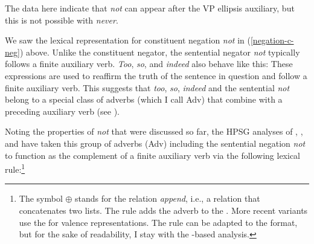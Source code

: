 \documentclass[output=paper
 	        ,biblatex
                ,babelshorthands
                ,newtxmath
                ,draftmode
                ,colorlinks, citecolor=brown
]{langscibook}
\begin{document}
\begin{exe}
\begin{xlist}
\begin{exe}
\begin{xlist}
\eal
\label{negation-vpe-not-ex}
\zl
%
\noindent The data here indicate that \textit{not} can appear
after the VP ellipsis auxiliary, but this is not possible with
\emph{never}.

We saw the lexical representation for constituent negation \textit{not} in (\ref{negation-c-neg})
above. Unlike the constituent negator, the sentential negator \textit{not} typically follows a
finite auxiliary verb. \textit{Too}, \textit{so}, and \textit{indeed} also behave like this: \eal
{}  \zl
%
These expressions are used to
reaffirm the truth of the sentence in question and
follow a finite auxiliary verb. This suggests that \emph{too}, \emph{so}, \emph{indeed} and the sentential \emph{not} belong to
a special class of adverbs (which I call Adv) that combine with a
preceding auxiliary verb (see \citealt[--95]{Kim:00}).

Noting the properties of \emph{not} that were discussed so far,
the HPSG analyses of \citet{AG:97}, \citet[Section~3.4]{Kim:00}, and \citet{Warner2000a-u}
have taken this group of adverbs (Adv) including the sentential negation \emph{not}
to function as the complement of a finite auxiliary verb via the following lexical
rule:\footnote{The symbol $\oplus$ stands for the relation \emph{append}, i.e., a relation
  that concatenates two lists. The rule adds the adverb to the \compsl. More recent variants
    use the \argstl for valence representations. The rule can be adapted to the \argst format, but
    for the sake of readability, I stay with the \comps-based analysis.}


\end{xlist}
\end{exe}
\end{xlist}
\end{exe}
\end{document}
